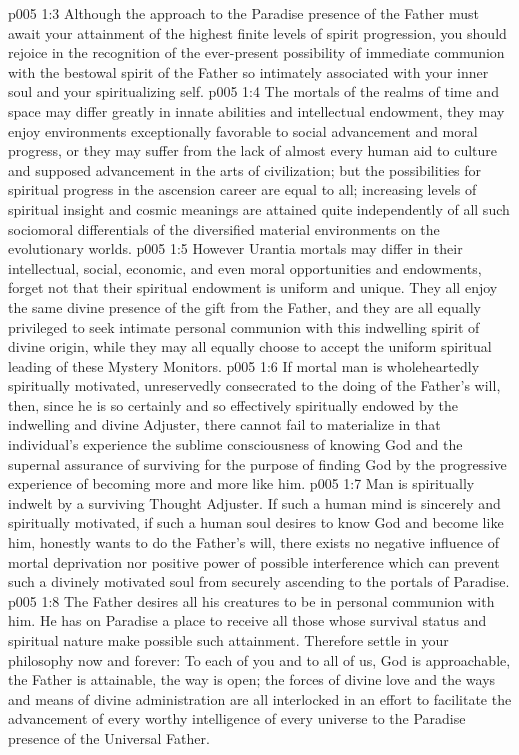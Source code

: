\pc \vs p005 1:3 Although the approach to the Paradise presence of the Father must await your attainment of the highest finite levels of spirit progression, you should rejoice in the recognition of the ever\hyp{}present possibility of immediate communion with the bestowal spirit of the Father so intimately associated with your inner soul and your spiritualizing self.
\vs p005 1:4 The mortals of the realms of time and space may differ greatly in innate abilities and intellectual endowment, they may enjoy environments exceptionally favorable to social advancement and moral progress, or they may suffer from the lack of almost every human aid to culture and supposed advancement in the arts of civilization; but the possibilities for spiritual progress in the ascension career are equal to all; increasing levels of spiritual insight and cosmic meanings are attained quite independently of all such sociomoral differentials of the diversified material environments on the evolutionary worlds.
\vs p005 1:5 However Urantia mortals may differ in their intellectual, social, economic, and even moral opportunities and endowments, forget not that their spiritual endowment is uniform and unique. They all enjoy the same divine presence of the gift from the Father, and they are all equally privileged to seek intimate personal communion with this indwelling spirit of divine origin, while they may all equally choose to accept the uniform spiritual leading of these Mystery Monitors.
\pc \vs p005 1:6 If mortal man is wholeheartedly spiritually motivated, unreservedly consecrated to the doing of the Father’s will, then, since he is so certainly and so effectively spiritually endowed by the indwelling and divine Adjuster, there cannot fail to materialize in that individual’s experience the sublime consciousness of knowing God and the supernal assurance of surviving for the purpose of finding God by the progressive experience of becoming more and more like him.
\vs p005 1:7 Man is spiritually indwelt by a surviving Thought Adjuster. If such a human mind is sincerely and spiritually motivated, if such a human soul desires to know God and become like him, honestly wants to do the Father’s will, there exists no negative influence of mortal deprivation nor positive power of possible interference which can prevent such a divinely motivated soul from securely ascending to the portals of Paradise.
\vs p005 1:8 The Father desires all his creatures to be in personal communion with him. He has on Paradise a place to receive all those whose survival status and spiritual nature make possible such attainment. Therefore settle in your philosophy now and forever: To each of you and to all of us, God is approachable, the Father is attainable, the way is open; the forces of divine love and the ways and means of divine administration are all interlocked in an effort to facilitate the advancement of every worthy intelligence of every universe to the Paradise presence of the Universal Father.
